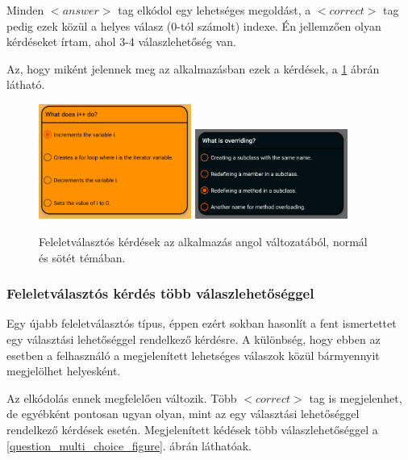 \documentclass[12pt,a4paper]{article}
\begin{document}
	Minden $<answer>$ tag elkódol egy lehetséges megoldást, a $<correct>$ tag pedig ezek közül a helyes válasz (0-tól számolt) indexe. Én jellemzően olyan kérdéseket írtam, ahol 3-4 válaszlehetőség van. 
	
	Az, hogy miként jelennek meg az alkalmazásban ezek a kérdések, a \ref{question_single_choice_figure} ábrán látható.
	
	\begin{figure}[h!]
		\centering
		\includegraphics[width=5cm]{question_single_choice}
		\includegraphics[width=5cm]{question_single_choice_dark}
		\caption{Feleletválasztós kérdések az alkalmazás angol változatából, normál és sötét témában.}
		\label{question_single_choice_figure}
	\end{figure}
	
	\subsubsection{Feleletválasztós kérdés több válaszlehetőséggel}
	
	Egy újabb feleletválasztós típus, éppen ezért sokban hasonlít a fent ismertettet egy választási lehetőséggel rendelkező kérdésre. A különbség, hogy ebben az esetben a felhasználó a megjelenített lehetséges válaszok közül bármyennyit megjelölhet helyesként.
	
	Az elkódolás ennek megfelelően változik. Több $<correct>$ tag is megjelenhet, de egyébként pontosan ugyan olyan, mint az egy választási lehetőséggel rendelkező kérdések esetén. Megjelenített kédések több válaszlehetőséggel a \ref{question_multi_choice_figure}. ábrán láthatóak.
	
\end{document}
